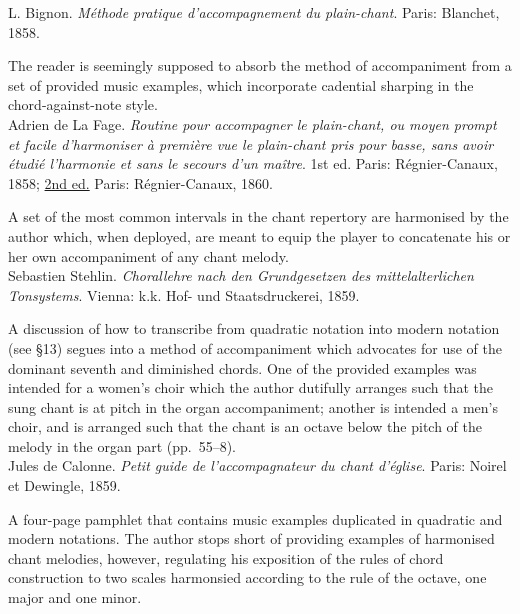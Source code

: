     \parindent=0pt
    \hangindent=0pt
  L. Bignon. \emph{Méthode pratique d'accompagnement du plain-chant}. Paris:  Blanchet, 1858.

     \parindent=20pt
     \hangindent=20pt
     The reader is seemingly supposed to absorb the method of accompaniment from a set of provided music examples, which incorporate cadential sharping in the chord-against-note style.\\

    \parindent=0pt
    \hangindent=0pt
  Adrien de La Fage. \emph{Routine pour accompagner le plain-chant, ou moyen prompt et facile d'harmoniser à première vue le plain-chant pris pour basse, sans avoir étudié l'harmonie et sans le secours d'un maître}. 1st ed. Paris:  Régnier-Canaux, 1858;  \underline{2nd ed.} Paris:  Régnier-Canaux, 1860.

     \parindent=20pt
     \hangindent=20pt
     A set of the most common intervals in the chant repertory are harmonised by the author which, when deployed, are meant to equip the player to concatenate his or her own accompaniment of any chant melody. \\

    \parindent=0pt
    \hangindent=0pt
  Sebastien Stehlin. \emph{Chorallehre nach den Grundgesetzen des mittelalterlichen Tonsystems}. Vienna:  k.k. Hof- und Staatsdruckerei, 1859.

     \parindent=20pt
     \hangindent=20pt
     A discussion of how to transcribe from quadratic notation into modern notation (see \S{}13) segues into a method of accompaniment which advocates for use of the dominant seventh and diminished chords. One of the provided examples was intended for a women's choir which the author dutifully arranges such that the sung chant is at pitch in the organ accompaniment; another is intended a men's choir, and is arranged such that the chant is an octave below the pitch of the melody in the organ part (pp.~55--8).\\

    \parindent=0pt
    \hangindent=0pt
  Jules de Calonne. \emph{Petit guide de l'accompagnateur du chant d'église}. Paris:  Noirel et Dewingle, 1859.

     \parindent=20pt
     \hangindent=20pt
     A four-page pamphlet that contains music examples duplicated in quadratic and modern notations. The author stops short of providing examples of harmonised chant melodies, however, regulating his exposition of the rules of chord construction to two scales harmonsied according to the rule of the octave, one major and one minor.\\

